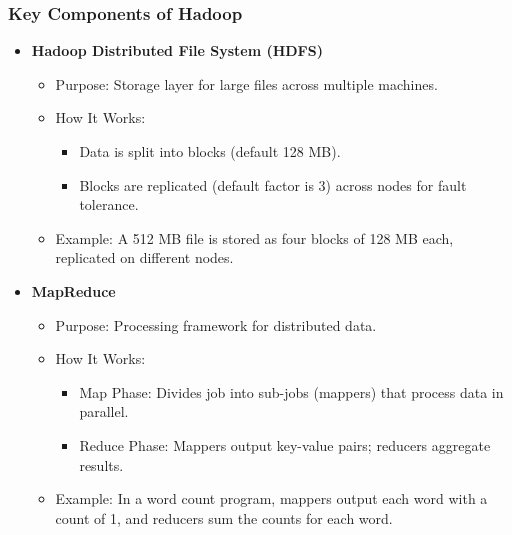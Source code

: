 \documentclass[aspectratio=169]{beamer}
\begin{document}
\begin{frame}
    \frametitle{Key Components of Hadoop}
    \begin{itemize}
        \item \textbf{Hadoop Distributed File System (HDFS)}
        \begin{itemize}
            \item Purpose: Storage layer for large files across multiple machines.
            \item How It Works:
            \begin{itemize}
                \item Data is split into blocks (default 128 MB).
                \item Blocks are replicated (default factor is 3) across nodes for fault tolerance.
            \end{itemize}
            \item Example: A 512 MB file is stored as four blocks of 128 MB each, replicated on different nodes.
        \end{itemize}
        
        \item \textbf{MapReduce}
        \begin{itemize}
            \item Purpose: Processing framework for distributed data.
            \item How It Works:
            \begin{itemize}
                \item Map Phase: Divides job into sub-jobs (mappers) that process data in parallel.
                \item Reduce Phase: Mappers output key-value pairs; reducers aggregate results.
            \end{itemize}
            \item Example: In a word count program, mappers output each word with a count of 1, and reducers sum the counts for each word.
        \end{itemize}
    \end{itemize}
\end{frame}
\end{document}
